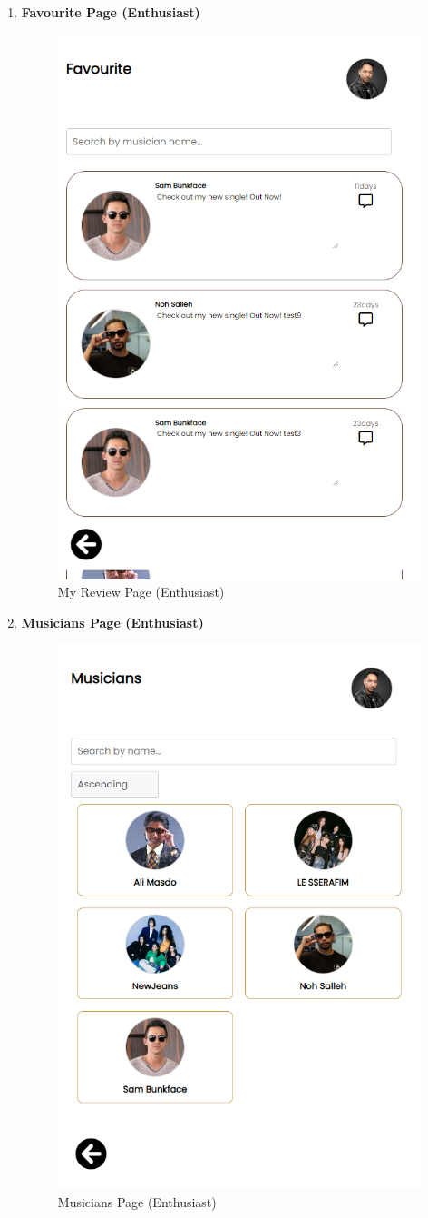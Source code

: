 \begin{enumerate}[1.]
    \item \textbf{Favourite Page (Enthusiast)}
    \begin{figure}[h]
        \centering
        \includegraphics[width=0.5\linewidth]{mainmatter/images/frontend/ss/Favourite (Enthusiast).png}
        \caption{My Review Page (Enthusiast)}
        \label{fig:myfig69}
    \end{figure}

    \item \textbf{Musicians Page (Enthusiast)}
    \begin{figure}[h]
        \centering
        \includegraphics[width=0.5\linewidth]{mainmatter/images/frontend/ss/Musicians (Enthusiast).png}
        \caption{Musicians Page (Enthusiast)}
        \label{fig:myfig70}
    \end{figure}
\end{enumerate}

